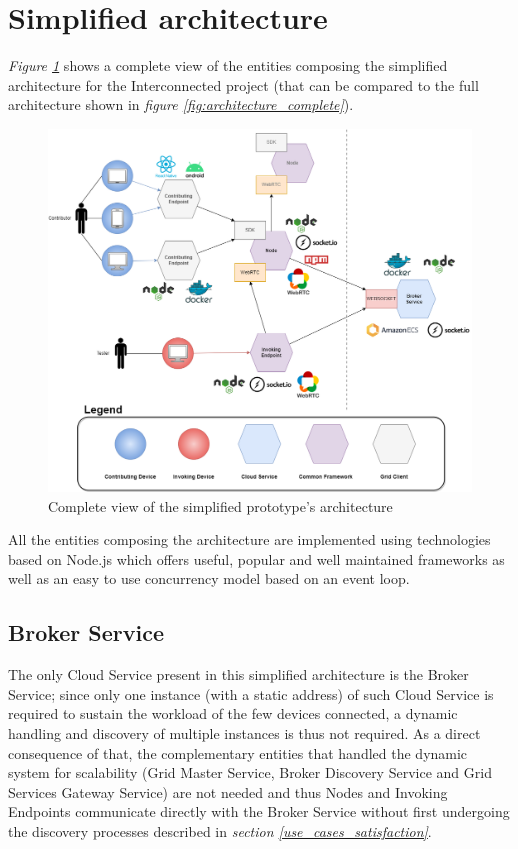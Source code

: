 \section{Simplified architecture}
\textit{Figure \ref{fig:simplified_architecture}} shows a complete view of the entities composing the simplified architecture for the Interconnected project (that can be compared to the full architecture shown in \textit{figure \ref{fig:architecture_complete}}).

\begin{figure}[!ht]
    \centering
    \includegraphics[width=\linewidth]{document/chapters/chapter_7/images/simplified_architecture.png}
    \caption{Complete view of the simplified prototype's architecture}
    \label{fig:simplified_architecture}
\end{figure}

\vspace{10mm}

All the entities composing the architecture are implemented using technologies based on Node.js which offers useful, popular and well maintained frameworks as well as an easy to use concurrency model based on an event loop.

\subsection{Broker Service}
The only Cloud Service present in this simplified architecture is the Broker Service; since only one instance (with a static address) of such Cloud Service is required to sustain the workload of the few devices connected, a dynamic handling and discovery of multiple instances is thus not required. As a direct consequence of that, the complementary entities that handled the dynamic system for scalability (Grid Master Service, Broker Discovery Service and Grid Services Gateway Service) are not needed and thus Nodes and Invoking Endpoints communicate directly with the Broker Service without first undergoing the discovery processes described in \textit{section \ref{use_cases_satisfaction}}.


